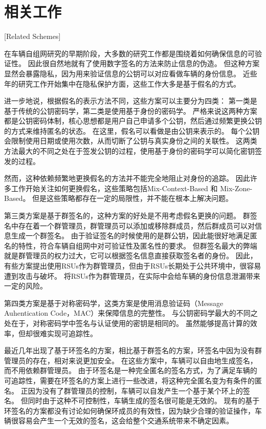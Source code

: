 \section{相关工作}[Related Schemes]

在车辆自组网研究的早期阶段，大多数的研究工作都是围绕着如何确保信息的可验证性。
因此很自然地就有了使用数字签名的方法来防止信息的伪造\cite{el2002security}。
但这种方案显然会暴露隐私，因为用来验证信息的公钥可以对应看做车辆的身份信息\cite{petit2015pseudonym}。
近些年的研究工作开始集中在隐私保护方面，这些工作大多是基于假名的方式。

进一步地说，根据假名的表示方法不同，这些方案可以主要分为四类\cite{petit2015pseudonym}：
第一类是基于传统的公钥密码学，第二类是使用基于身份的密码学。
严格来说这两种方案都是公钥密码体制，核心思想都是用户自己申请多个公钥，然后通过频繁更换公钥的方式来维持匿名的状态。
在这里，假名可以看做是由公钥来表示的。
每个公钥会限制使用日期或使用次数，从而切断了公钥与真实身份之间的关联性。
这两类方法最大的不同之处在于签发公钥的过程，使用基于身份的密码学可以简化密钥签发的过程。

然而，这种依赖频繁地更换假名的方法并不能完全地阻止对身份的追踪\cite{wiedersheim2010privacy}。
因此许多工作开始关注如何更换假名，这些策略包括Mix-Context-Based 和 Mix-Zone-Based\cite{jemaa2017study,ying2013dynamic,lu2012pseudonym}。
但是这些策略都存在一定的局限性，并不能在根本上解决问题。

第三类方案是基于群签名的，这种方案的好处是不用考虑假名更换的问题。
群签名中存在着一个群管理员，群管理员可以添加或移除群成员，然后群成员可以对信息生成一个群签名。
由于验证签名的时候使用的是群公钥，因此能很好地满足匿名的特性，符合车辆自组网中对可验证性及匿名性的要求。
但群签名最大的弊端就是群管理员的权力过大，它可以根据签名信息直接获取签名者的身份。
因此，有些方案提出使用RSUs作为群管理员\cite{hao2011distributed,park2011rsu}，但由于RSUs长期处于公共环境中，很容易遭到攻击与破坏。
将RSUs作为群管理员，在实际中会给车辆的身份信息泄漏带来一定的风险。

第四类方案是基于对称密码学，这类方案是使用消息验证码（Message Auhentication Code，MAC）来保障信息的完整性\cite{petit2015pseudonym,choi2005balancing}。
与公钥密码学最大的不同之处在于，对称密码学中签名与认证使用的密钥是相同的。
虽然能够提高计算的效率，但却很难实现可追踪性。

最近几年出现了基于环签名的方案\cite{xiong2010efficient,chaurasia2011conditional,zeng2015privacy}，相比基于群签名的方案，环签名中因为没有群管理员的存在，相对来说更加安全。
在这些方案中，车辆可以自由地生成签名，而不用依赖群管理员。
由于环签名是一种完全匿名的签名方式，为了满足车辆的可追踪性，需要在环签名的方案上进行一些改进，将这种完全匿名变为有条件的匿名\cite{张建明2012车辆自组网的位置隐私保护技术研究}。
正因为没有了群管理员的控制，车辆可以自发产生一个基于某个环上的签名。
但同时由于这种不可控制性，车辆生成的签名很可能是无效的。
现有的基于环签名的方案都没有讨论如何确保环成员的有效性，因为缺少合理的验证操作，车辆很容易会产生一个无效的签名，这会给整个交通系统带来不确定因素。

